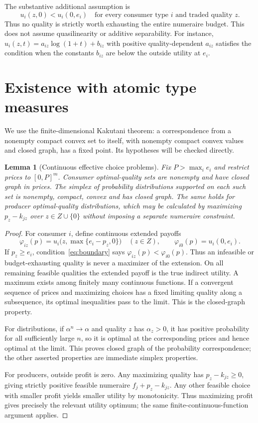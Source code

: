 \documentclass[11pt,a4paper]{article}
\newtheorem{lemma}[theorem]{Lemma}
\theoremstyle{definition}
\theoremstyle{remark}
\begin{document}
The substantive additional assumption is
\begin{equation}\label{eq:boundary}
 u_i(z,0)<u_i(0,e_i)\quad\text{for every consumer type }i
                 \text{ and traded quality }z.
\end{equation}
Thus no quality is strictly worth exhausting the entire numeraire budget. This does not assume quasilinearity or additive separability. For instance, $u_i(z,t)=a_{iz}\log(1+t)+b_{iz}$ with positive quality-dependent $a_{iz}$ satisfies the condition when the constants $b_{iz}$ are below the outside utility at $e_i$.

\section{Existence with atomic type measures}
We use the finite-dimensional Kakutani theorem: a correspondence from a nonempty compact convex set to itself, with nonempty compact convex values and closed graph, has a fixed point. Its hypotheses will be checked directly.

\begin{lemma}[Continuous effective choice problems]\label{le:choices}
Fix $P>\max_i e_i$ and restrict prices to $[0,P]^m$. Consumer optimal-quality sets are nonempty and have closed graph in prices. The simplex of probability distributions supported on each such set is nonempty, compact, convex and has closed graph. The same holds for producer optimal-quality distributions, which may be calculated by maximizing $p_z-k_{jz}$ over $z\in Z\cup\{0\}$ without imposing a separate numeraire constraint.
\end{lemma}
\begin{proof}
For consumer $i$, define continuous extended payoffs
\[
 \varphi_{iz}(p)=u_i\bigl(z,\max\{e_i-p_z,0\}\bigr)
 \quad(z\in Z),\qquad \varphi_{i0}(p)=u_i(0,e_i).
\]
If $p_z\geq e_i$, condition~\eqref{eq:boundary} says $\varphi_{iz}(p)<\varphi_{i0}(p)$. Thus an infeasible or budget-exhausting quality is never a maximizer of the extension. On all remaining feasible qualities the extended payoff is the true indirect utility. A maximum exists among finitely many continuous functions. If a convergent sequence of prices and maximizing choices has a fixed limiting quality along a subsequence, its optimal inequalities pass to the limit. This is the closed-graph property.

For distributions, if $\alpha^n\to\alpha$ and quality $z$ has $\alpha_z>0$, it has positive probability for all sufficiently large $n$, so it is optimal at the corresponding prices and hence optimal at the limit. This proves closed graph of the probability correspondence; the other asserted properties are immediate simplex properties.

For producers, outside profit is zero. Any maximizing quality has $p_z-k_{jz}\geq0$, giving strictly positive feasible numeraire $f_j+p_z-k_{jz}$. Any other feasible choice with smaller profit yields smaller utility by monotonicity. Thus maximizing profit gives precisely the relevant utility optimum; the same finite-continuous-function argument applies.
\end{proof}
\end{document}
